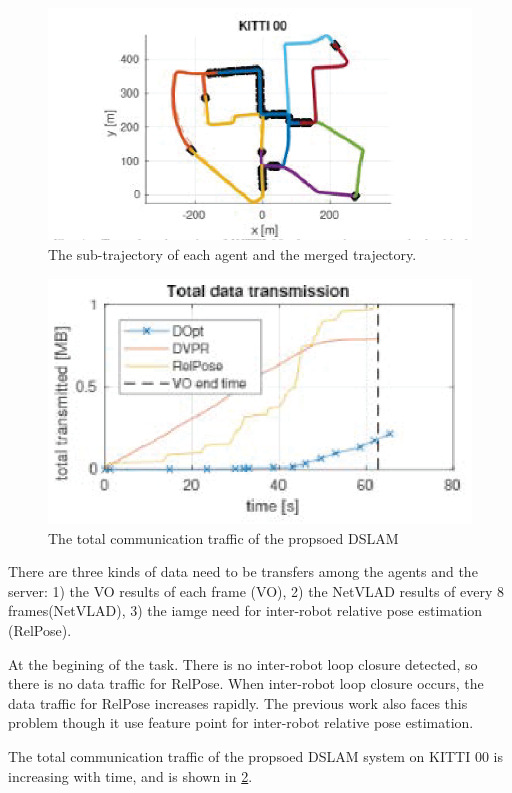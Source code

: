\begin{figure}[ht]
  \centering  
  \includegraphics[width=0.85\linewidth]{fig/dslam.eps}
  \caption{The sub-trajectory of each agent and the merged trajectory.}
  \label{fig:dslam}
\end{figure}

\begin{figure}[thb]
  \centering  
  \includegraphics[width=0.85\linewidth]{fig/data.eps}
  \caption{The total communication traffic of the propsoed DSLAM}
  \label{fig:data}
\end{figure}

There are three kinds of data need to be transfers among the agents and the server: 1) the VO results of each frame (VO), 2) the NetVLAD results of every 8 frames(NetVLAD), 3) the iamge need for inter-robot relative pose estimation (RelPose).

At the begining of the task. There is no inter-robot loop closure detected, so there is no data traffic for RelPose. When inter-robot loop closure occurs, the data traffic for RelPose increases rapidly. The previous work\cite{Cieslewski:20187ee} also faces this problem though it use feature point for inter-robot relative pose estimation.


The total communication traffic of the propsoed DSLAM system on KITTI 00 is increasing with time, and is shown in \cref{fig:data}.
